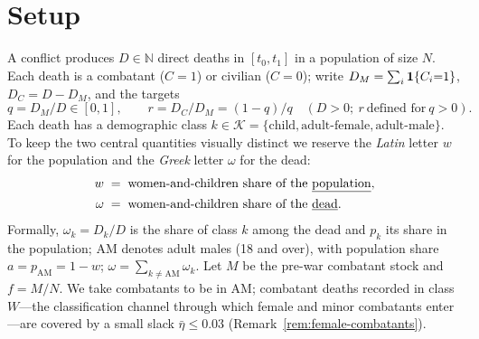 \section{Setup}\label{sec:setup}

A conflict produces $D\in\mathbb N$ direct deaths in $[t_0,t_1]$ in a population of size $N$. Each death is a combatant ($C=1$) or civilian ($C=0$); write $D_M=\sum_i\mathbf{1}\{C_i{=}1\}$, $D_C=D-D_M$, and the targets
\[
q = D_M / D \in [0, 1], \qquad r = D_C / D_M = (1 - q)/q \quad (D>0;\ r\ \text{defined for}\ q>0).
\]
Each death has a demographic class $k\in\mathcal K=\{\text{child},\text{adult-female},\text{adult-male}\}$. To keep the two central quantities visually distinct we reserve the \emph{Latin} letter $w$ for the population and the \emph{Greek} letter $\omega$ for the dead:
\begin{align*}
w \;&=\; \text{women-and-children share of the \underline{population}},\\
\omega \;&=\; \text{women-and-children share of the \underline{dead}}.
\end{align*}
Formally, $\omega_k=D_k/D$ is the share of class $k$ among the dead and $p_k$ its share in the population; $\mathrm{AM}$ denotes adult males (18 and over), with population share $a=p_{\mathrm{AM}}=1-w$; $\omega=\sum_{k\ne\mathrm{AM}}\omega_k$. Let $M$ be the pre-war combatant stock and $f=M/N$. We take combatants to be in $\mathrm{AM}$; combatant deaths recorded in class $W$---the classification channel through which female and minor combatants enter---are covered by a small slack $\bar\eta\le 0.03$ (Remark~\ref{rem:female-combatants}).

